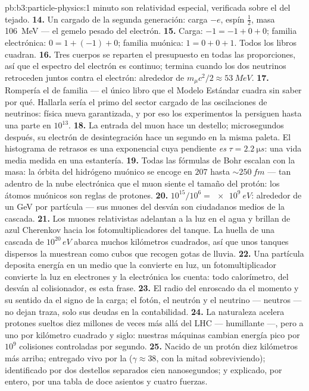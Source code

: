 \begin{solution}{pb:b3:particle-physics:1}
minuto son relatividad especial, verificada sobre el  del tejado.
\textbf{14.} Un  cargado de la segunda generación:
carga $-e$, espín $\tfrac12$, masa \qty{106}{MeV} --- el
gemelo pesado del electrón.
\textbf{15.} Carga: $-1 = -1 + 0 + 0$; familia electrónica:
$0 = 1 + (-1) + 0$; familia muónica: $1 = 0 + 0 + 1$. Todos los libros
cuadran.
\textbf{16.} Tres cuerpos se reparten el presupuesto en todas las proporciones,
así que el espectro del electrón es continuo; termina cuando los dos
neutrinos retroceden juntos contra el electrón: alrededor de
$m_\mu c^2/2 \approx \qty{53}{MeV}$.
\textbf{17.} Rompería el  de familia --- el único
libro que el Modelo Estándar cuadra sin saber por qué. Hallarla
sería el primo del sector cargado de las oscilaciones de neutrinos:
física nueva garantizada, y por eso los experimentos la persiguen hasta
una parte en $10^{13}$.
\textbf{18.} La entrada del muon hace un destello; microsegundos
después, su electrón de desintegración hace un segundo en la misma paleta. El
histograma de retrasos es una exponencial cuya pendiente \emph{es}
$\tau = \qty{2.2}{\micro s}$: una vida media medida en una estantería.
\textbf{19.} Todas las fórmulas de Bohr escalan con la masa: la órbita del
hidrógeno muónico se encoge en $207$ hasta ${\sim}\qty{250}{fm}$ ---
tan adentro de la nube electrónica que el muon siente el
tamaño del protón: los átomos muónicos son reglas de protones.
\textbf{20.} $10^{15}/10^{6} = \qty{e9}{eV}$: alrededor de un GeV por
partícula --- sus muones del desván son ciudadanos medios de la cascada.
\textbf{21.} Los muones relativistas adelantan a la luz en el agua y brillan
de azul Cherenkov hacia los fotomultiplicadores del tanque. La
huella de una cascada de $10^{20}\,\unit{eV}$ abarca muchos kilómetros
cuadrados, así que unos tanques dispersos la muestrean como cubos que recogen
gotas de lluvia.
\textbf{22.} Una partícula deposita energía en un medio que
la convierte en luz, un fotomultiplicador convierte la luz en
electrones y la electrónica los cuenta: todo calorímetro, del
desván al colisionador, es esta frase.
\textbf{23.} El radio del enroscado da el momento y su sentido da
el signo de la carga; el fotón, el neutrón y el neutrino ---
neutros --- no dejan traza, solo sus deudas en la
contabilidad.
\textbf{24.} La naturaleza acelera protones sueltos diez millones de
veces más allá del LHC --- humillante ---, pero a uno por kilómetro
cuadrado y siglo: nuestras máquinas cambian energía pico por
$10^{9}$ colisiones controladas por segundo.
\textbf{25.} Nacido de un protón diez kilómetros más arriba; entregado
vivo por la  ($\gamma \approx 38$, con la mitad sobreviviendo);
identificado por dos destellos separados cien nanosegundos; y
explicado, por entero, por una tabla de doce asientos y cuatro
fuerzas.
\end{solution}

